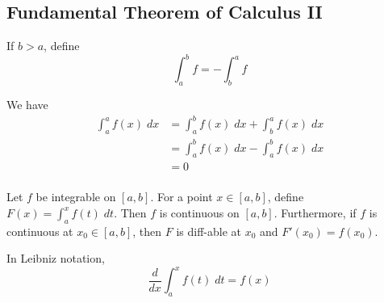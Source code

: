 \documentclass{article}
\begin{document}
  \subsection{Fundamental Theorem of Calculus II}
  \begin{definition}
    If $b > a$, define \[
      \int_a^b f = -\int_b^a f
    \]
  \end{definition}
  \begin{corollary}
    We have
    \begin{align*}
      \int_a^a f(x) \; dx
      &= \int_a^b f(x) \; dx + \int_b^a f(x) \; dx\\
      &= \int_a^b f(x) \; dx - \int_a^b f(x) \; dx\\
      &= 0\\
    \end{align*}
  \end{corollary}
  \begin{cthm}[FTC II]
    Let $f$ be integrable on $[a, b]$. For a point $x \in [a, b]$, define $F(x) = \int_a^x f(t) \; dt$. Then $f$ is continuous on $[a, b]$. Furthermore, if $f$ is continuous at $x_0 \in [a, b]$, then $F$ is diff-able at $x_0$ and $F'(x_0) = f(x_0)$.

    In Leibniz notation, \[
      \frac{d}{dx} \int_a^x f(t) \; dt = f(x)
    \]
  \end{cthm}
\end{document}
